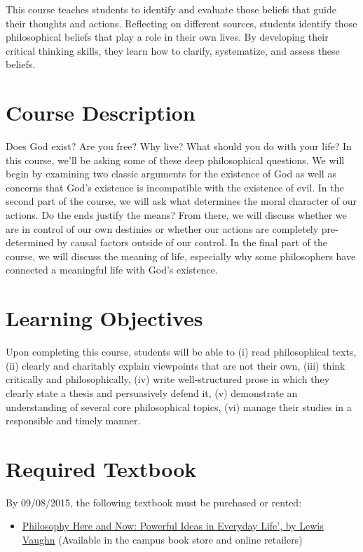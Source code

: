 \documentclass[11pt,article,oneside]{memoir}
\begin{document}
This course teaches students to identify and evaluate those beliefs that guide their thoughts and actions. Reflecting on different sources, students identify those philosophical beliefs that play a role in their own lives. By developing their critical thinking skills, they learn how to clarify, systematize, and assess these beliefs. 

\section{Course Description}

Does God exist? Are you free? Why live? What should you do with your life?  In this
course, we'll be asking some of these deep philosophical questions. We
will begin by examining two classic arguments for the existence of God
as well as concerns that God's existence is incompatible with the
existence of evil. In the second part of the course, we will ask what determines the moral character of our actions. Do the ends justify the means? From there, we will discuss whether we are in control of our own destinies or whether our actions are completely pre-determined by causal factors outside of our control. In the final part of the course, we will discuss the meaning of life, especially why some philosophers have connected a meaningful life with God's existence.

\section{Learning Objectives}

Upon completing this course, students will be able to (i) read
philosophical texts, (ii) clearly and charitably explain viewpoints that
are not their own, (iii) think critically and philosophically, (iv)
write well-structured prose in which they clearly state a thesis and
persuasively defend it, (v) demonstrate an understanding of several core
philosophical topics, (vi) manage their studies in a responsible and timely manner. 

\section{Required Textbook}

By 09/08/2015, the following textbook must be purchased or rented:

\begin{itemize}
\item
  \href{http://www.amazon.com/Philosophy-Here-Now-Powerful-Everyday/dp/0199765227}{Philosophy
  Here and Now: Powerful Ideas in Everyday Life', by Lewis Vaughn}
  (Available in the campus book store and online retailers)
\end{itemize}
\end{document}
